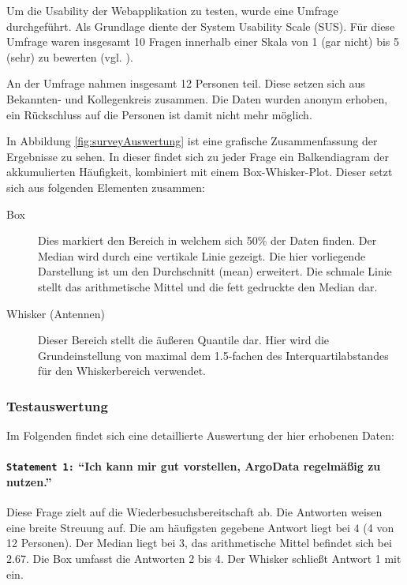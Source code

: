 Um die Usability der Webapplikation zu testen, wurde eine Umfrage durchgeführt. Als Grundlage diente der System Usability Scale (SUS).
Für diese Umfrage waren insgesamt 10 Fragen innerhalb einer Skala von 1 (gar nicht) bis 5 (sehr)  zu bewerten (vgl. \cite{Quantita52:online}).

An der Umfrage nahmen insgesamt 12 Personen teil. Diese setzen sich aus Bekannten- und Kollegenkreis zusammen. Die Daten wurden anonym erhoben, ein Rückschluss auf die Personen ist damit nicht mehr möglich.

In Abbildung \ref{fig:surveyAuswertung}
ist eine grafische Zusammenfassung der Ergebnisse zu sehen. In dieser findet sich zu jeder Frage ein Balkendiagram der akkumulierten Häufigkeit, kombiniert mit einem Box-Whisker-Plot. Dieser setzt sich aus folgenden Elementen zusammen:

\begin{description}
 \item [Box]
    Dies markiert den Bereich in welchem sich 50\% der Daten finden. Der Median wird durch eine vertikale Linie gezeigt. Die hier vorliegende Darstellung ist um den Durchschnitt (mean) erweitert. Die schmale Linie stellt das arithmetische Mittel und die fett gedruckte den Median dar.
 \item [Whisker (Antennen)]
    Dieser Bereich stellt die äußeren Quantile dar. Hier wird die Grundeinstellung von maximal dem 1.5-fachen des Interquartilabstandes für den Whiskerbereich verwendet.
\end{description}


\subsubsection{Testauswertung}

Im Folgenden findet sich eine detaillierte Auswertung der hier erhobenen Daten:


\paragraph{\texttt{Statement 1:} "`Ich kann mir gut vorstellen, ArgoData regelmäßig zu nutzen."'}
    Diese Frage zielt auf die Wiederbesuchsbereitschaft ab. Die Antworten weisen eine breite Streuung auf. Die am häufigsten gegebene Antwort liegt bei $4$ (4 von 12 Personen). Der Median liegt bei $3$, das arithmetische Mittel befindet sich bei $2.67$. Die Box umfasst die Antworten 2 bis 4. Der Whisker schließt Antwort 1 mit ein.

